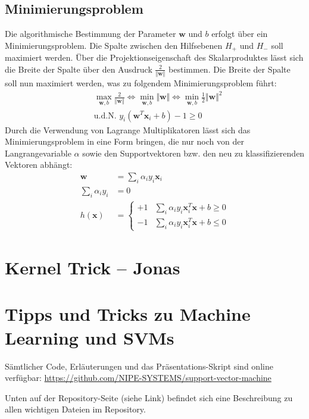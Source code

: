 \documentclass[10pt,a4paper]{scrartcl}
\begin{document}
\begin{multicols}{2}
            \subsection{Minimierungsproblem}
                Die algorithmische Bestimmung der Parameter $\boldsymbol{w}$ und $b$ erfolgt über ein Minimierungsproblem. Die Spalte zwischen den Hilfsebenen $H_+$ und $H_-$ soll maximiert werden. Über die Projektionseigenschaft des Skalarproduktes lässt sich die Breite der Spalte über den Ausdruck $\frac{2}{\Vert \boldsymbol{w} \Vert}$ bestimmen. Die Breite der Spalte soll nun maximiert werden, was zu folgendem Minimierungsproblem führt:
                \begin{align*}
                    & \max_{\boldsymbol{w}, b} \frac{2}{\Vert \boldsymbol{w} \Vert} \Leftrightarrow \min_{\boldsymbol{w}, b} \Vert \boldsymbol{w} \Vert \Leftrightarrow \min_{\boldsymbol{w}, b} \frac{1}{2} \Vert \boldsymbol{w} \Vert^2 \\
                    & \text{u.d.N. } y_i ( \boldsymbol{w}^T \boldsymbol{x}_i + b ) - 1 \geq 0
                \end{align*}
                Durch die Verwendung von Lagrange Multiplikatoren lässt sich das Minimierungsproblem in eine Form bringen, die nur noch von der Langrangevariable $\alpha$ sowie den Supportvektoren bzw. den neu zu klassifizierenden Vektoren abhängt:
                \begin{align*}
                    \boldsymbol{w} &= \sum_i \alpha_i y_i \boldsymbol{x}_i \\
                    \sum_i \alpha_i y_i &= 0 \\
                    h(\boldsymbol{x}) &= \begin{cases}
                        +1 & \sum_i \alpha_i y_i \boldsymbol{x}_i^T \boldsymbol{x} + b \geq 0 \\
                        -1 & \sum_i \alpha_i y_i \boldsymbol{x}_i^T \boldsymbol{x} + b \leq 0
                    \end{cases}
                \end{align*}
        \section{Kernel Trick -- Jonas}

        \section{Tipps und Tricks zu Machine Learning und SVMs}
            Sämtlicher Code, Erläuterungen und das Präsentations-Skript sind online verfügbar: \url{https://github.com/NIPE-SYSTEMS/support-vector-machine}
            
            Unten auf der Repository-Seite (siehe Link) befindet sich eine Beschreibung zu allen wichtigen Dateien im Repository.


    \end{multicols}
\end{document}
